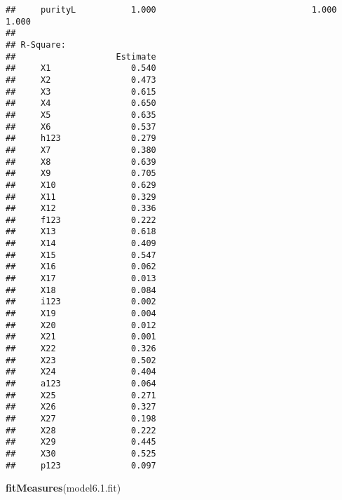 \documentclass[english,man]{apa6}
\newenvironment{Shaded}{\begin{snugshade}}{\end{snugshade}}
\newcommand{\KeywordTok}[1]{\textcolor[rgb]{0.13,0.29,0.53}{\textbf{#1}}}
\newcommand{\FloatTok}[1]{\textcolor[rgb]{0.00,0.00,0.81}{#1}}
\newcommand{\NormalTok}[1]{#1}
\theoremstyle{definition}
\theoremstyle{definition}
\theoremstyle{definition}
\theoremstyle{remark}
\begin{document}
\begin{verbatim}
##     purityL           1.000                               1.000    1.000
## 
## R-Square:
##                    Estimate
##     X1                0.540
##     X2                0.473
##     X3                0.615
##     X4                0.650
##     X5                0.635
##     X6                0.537
##     h123              0.279
##     X7                0.380
##     X8                0.639
##     X9                0.705
##     X10               0.629
##     X11               0.329
##     X12               0.336
##     f123              0.222
##     X13               0.618
##     X14               0.409
##     X15               0.547
##     X16               0.062
##     X17               0.013
##     X18               0.084
##     i123              0.002
##     X19               0.004
##     X20               0.012
##     X21               0.001
##     X22               0.326
##     X23               0.502
##     X24               0.404
##     a123              0.064
##     X25               0.271
##     X26               0.327
##     X27               0.198
##     X28               0.222
##     X29               0.445
##     X30               0.525
##     p123              0.097
\end{verbatim}

\begin{Shaded}
\begin{Highlighting}[]
\KeywordTok{fitMeasures}\NormalTok{(model6.}\FloatTok{1.}\NormalTok{fit)}
\end{Highlighting}
\end{Shaded}
\end{document}
